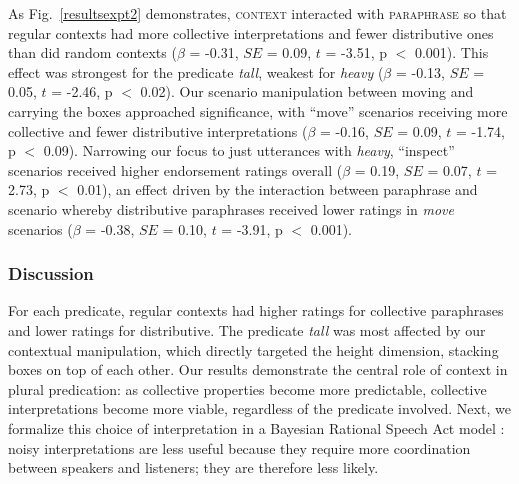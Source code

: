 \documentclass[linguex]{sp}
\begin{document}
As Fig.~\ref{resultsexpt2} demonstrates, \textsc{context} interacted with \textsc{paraphrase} so that regular contexts had more collective interpretations and fewer distributive ones than did random contexts ($\beta$ = -0.31, $SE$ = 0.09, $t$ = -3.51, p $<$ 0.001). This effect was strongest for the predicate \emph{tall}, weakest for \emph{heavy} ($\beta$ = -0.13, $SE$ = 0.05, $t$ = -2.46, p $<$ 0.02). Our scenario manipulation between moving and carrying the boxes approached significance, with ``move'' scenarios receiving more collective and fewer distributive interpretations ($\beta$ = -0.16, $SE$ = 0.09, $t$ = -1.74, p $<$ 0.09). Narrowing our focus to just utterances with \emph{heavy}, ``inspect'' scenarios received higher endorsement ratings overall ($\beta$ = 0.19, $SE$ = 0.07, $t$ = 2.73, p $<$ 0.01), an effect driven by the interaction between paraphrase and scenario whereby distributive paraphrases received lower ratings in \emph{move} scenarios ($\beta$ = -0.38, $SE$ = 0.10, $t$ = -3.91, p $<$ 0.001).


\subsubsection{Discussion}

For each predicate, regular contexts had higher ratings for collective paraphrases and lower ratings for distributive. The predicate \textit{tall} was most affected by our contextual manipulation, which directly targeted the height dimension, stacking boxes on top of each other. Our results demonstrate the central role of context in plural predication: as collective properties become more predictable, collective interpretations become more viable, regardless of the predicate involved. Next, we formalize this choice of interpretation in a Bayesian Rational Speech Act model \citep{frankgoodman2012,lassitergoodman2013}: noisy interpretations are less useful because they require more coordination between speakers and listeners; they are therefore less likely.
\end{document}
